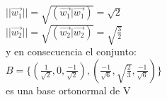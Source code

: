 \documentclass[preview]{standalone}
\begin{document}
\begin{center}
 \\\  $||\vec{w_1}|| = \sqrt{(\vec{w_1}|\vec{w_1})} = \sqrt{2}$ \\\  $||\vec{w_2}|| = \sqrt{(\vec{w_2}|\vec{w_2})} = \sqrt{\frac{3}{2}} $ \\\  y en consecuencia el conjunto: \\\  $B = \{ (\frac{1}{\sqrt{2}}, 0, \frac{-1}{\sqrt{2}}), (\frac{-1}{\sqrt{6}}, \sqrt{\frac{2}{3}}, \frac{-1}{\sqrt{6}}) \} $ \\\  es una base ortonormal de V
\end{center}
\end{document}
